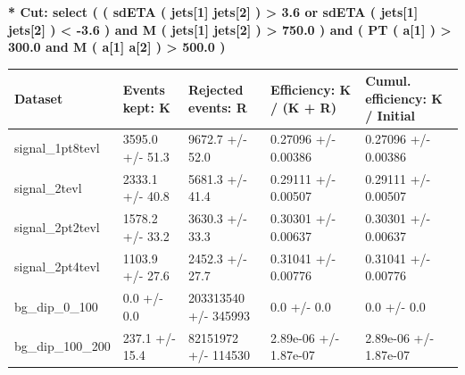 \documentclass[a4paper, 10pt]{article}
\begin{document}
\textbf{* Cut: select ( ( sdETA ( jets[1] jets[2] ) > 3.6 or sdETA ( jets[1] jets[2] ) < -3.6 ) and M ( jets[1] jets[2] ) > 750.0 ) and ( PT ( a[1] ) > 300.0 and M ( a[1] a[2] ) > 500.0 )}\\
   \begin{table}[H]
  \begin{center}
    \begin{tabular}{|m{20.0mm}|m{27.0mm}|m{27.0mm}|m{33.0mm}|m{32.0mm}|}
      \hline
      {\cellcolor{yellow}         Dataset}& {\cellcolor{yellow}         Events kept:
          K}& {\cellcolor{yellow}         Rejected events:
          R}& {\cellcolor{yellow}         Efficiency:
          K /\- (K + R)}& {\cellcolor{yellow}         Cumul. efficiency:
          K /\- Initial}\\
      \hline
      {\cellcolor{white}         signal\_1pt8tevl}& {\cellcolor{white}         3595.0 +/\-- 51.3}& {\cellcolor{white}         9672.7 +/\-- 52.0}& {\cellcolor{white}         0.27096 +/\-- 0.00386}& {\cellcolor{white}         0.27096 +/\-- 0.00386}\\
      \hline
      {\cellcolor{white}         signal\_2tevl}& {\cellcolor{white}         2333.1 +/\-- 40.8}& {\cellcolor{white}         5681.3 +/\-- 41.4}& {\cellcolor{white}         0.29111 +/\-- 0.00507}& {\cellcolor{white}         0.29111 +/\-- 0.00507}\\
      \hline
      {\cellcolor{white}         signal\_2pt2tevl}& {\cellcolor{white}         1578.2 +/\-- 33.2}& {\cellcolor{white}         3630.3 +/\-- 33.3}& {\cellcolor{white}         0.30301 +/\-- 0.00637}& {\cellcolor{white}         0.30301 +/\-- 0.00637}\\
      \hline
      {\cellcolor{white}         signal\_2pt4tevl}& {\cellcolor{white}         1103.9 +/\-- 27.6}& {\cellcolor{white}         2452.3 +/\-- 27.7}& {\cellcolor{white}         0.31041 +/\-- 0.00776}& {\cellcolor{white}         0.31041 +/\-- 0.00776}\\
      \hline
      {\cellcolor{white}         bg\_dip\_0\_100}& {\cellcolor{white}         0.0 +/\-- 0.0}& {\cellcolor{white}         203313540 +/\-- 345993}& {\cellcolor{white}         0.0 +/\-- 0.0}& {\cellcolor{white}         0.0 +/\-- 0.0}\\
      \hline
      {\cellcolor{white}         bg\_dip\_100\_200}& {\cellcolor{white}         237.1 +/\-- 15.4}& {\cellcolor{white}         82151972 +/\-- 114530}& {\cellcolor{white}         2.89e-06 +/\-- 1.87e-07}& {\cellcolor{white}         2.89e-06 +/\-- 1.87e-07}\\

\end{tabular}
\end{center}
\end{table}
\end{document}
